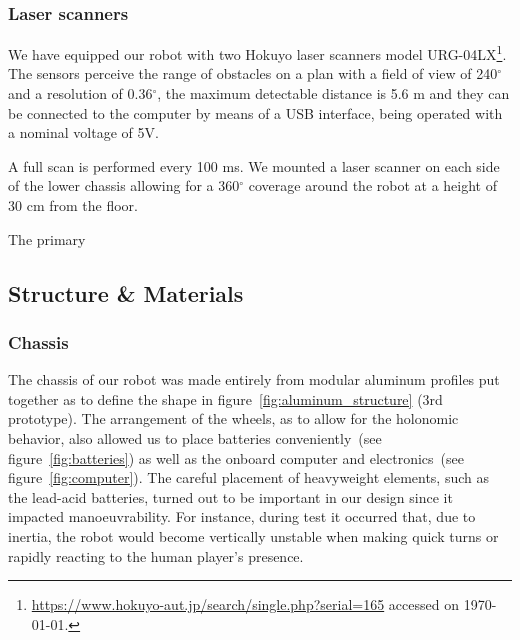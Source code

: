 \subsubsection{Laser scanners}\label{sec:lasers_hokuyo}
We have equipped our robot with two Hokuyo laser scanners model URG-04LX\footnote{\url{https://www.hokuyo-aut.jp/search/single.php?serial=165} accessed on \today.}. The sensors perceive the range of obstacles on a plan with a field of view of 240$^\circ$ and a resolution of 0.36$^\circ$, the maximum detectable distance is 5.6 m and they can be connected to the computer by means of a USB interface, being operated with a nominal voltage of 5V.



A full scan is performed every 100 ms. We mounted a laser scanner on each side of the lower chassis allowing for a 360$^\circ$ coverage around the robot at a height of 30 cm from the floor.

The primary 

\subsection{Structure \& Materials}
\subsubsection{Chassis}
The chassis of our robot was made entirely from modular aluminum profiles put together as to define the shape in figure~\ref{fig:aluminum_structure} (3rd prototype). The arrangement of the wheels, as to allow for the holonomic behavior, also allowed us to place batteries conveniently~(see figure~\ref{fig:batteries}) as well as the onboard computer and electronics~(see figure~\ref{fig:computer}). The careful placement of heavyweight elements, such as the lead-acid batteries, turned out to be important in our design since it impacted manoeuvrability. For instance, during test it occurred that, due to inertia, the robot would become vertically unstable when making quick turns or rapidly reacting to the human player's presence. 

